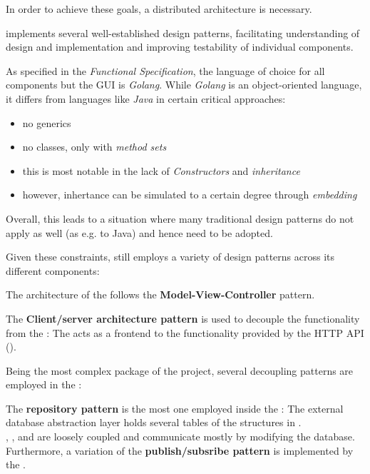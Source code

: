 In order to achieve these goals, a distributed architecture is necessary.

\mamid implements several well-established design patterns, facilitating understanding of design and implementation and improving
testability of individual components.

As specified in the \emph{Functional Specification}, the language of choice for all components but the GUI is \emph{Golang}.
While \emph{Golang} is an object-oriented language, it differs from languages like \emph{Java} in certain critical approaches:
\begin{itemize}
  \item no generics
  \item no classes, only  with \emph{method sets}
  \item this is most notable in the lack of \emph{Constructors} and \emph{inheritance}
  \item however, inhertance can be simulated to a certain degree through \emph{embedding} %
\end{itemize}

Overall, this leads to a situation where many traditional design patterns do not apply as well (as e.g. to Java) and hence need
to be adopted.

Given these constraints, \mamid still employs a variety of design patterns across its different components:

The architecture of the  follows the \textbf{Model-View-Controller} pattern.

The \textbf{Client/server architecture pattern} is used to decouple the  functionality from the :
The  acts as a frontend to the functionality provided by the  HTTP API ().

Being the most complex package of the project, several decoupling patterns are employed in the :

The \textbf{repository pattern} is the most one employed inside the :
The external  database abstraction layer holds several tables of the structures in .\\
,  ,
 and   are loosely coupled and communicate mostly by
modifying the database.\\
Furthermore, a variation of the \textbf{publish/subsribe pattern} is implemented by the .

